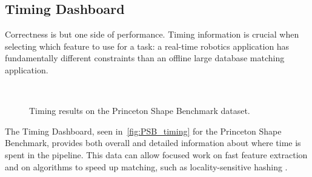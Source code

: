 \subsection{Timing Dashboard}

Correctness is but one side of performance.
Timing information is crucial when selecting which feature to use for a task: a real-time robotics application has fundamentally different constraints than an offline large database matching application.

\begin{figure}[thpb]
\centering
{}
 \\
\vspace{1em}
\caption{Timing results on the Princeton Shape Benchmark dataset.}
\label{fig:PSB_timing}
\end{figure}

The Timing Dashboard, seen in~\autoref{fig:PSB_timing} for the Princeton Shape Benchmark, provides both overall and detailed information about where time is spent in the pipeline.
This data can allow focused work on fast feature extraction and on algorithms to speed up matching, such as locality-sensitive hashing \cite{Frome2004}.

